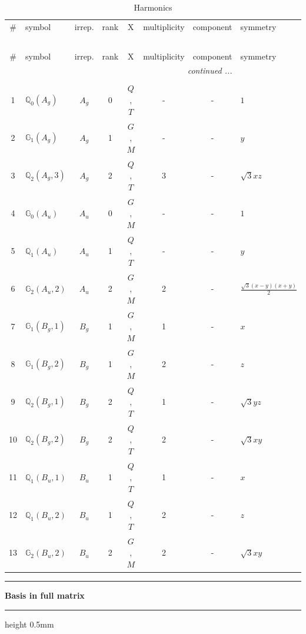 \documentclass[fleqn,10pt,landscape]{jsarticle}
\begin{document}
\renewcommand{\arraystretch}{1.6}
\begin{longtable}[l]{clcccccl}
\captionsetup{justification=raggedright, singlelinecheck=off}
\caption{Harmonics}
 \\
 \hline \hline
\# & symbol & irrep. & rank & X & multiplicity & component & symmetry \\ \hline \endfirsthead

\multicolumn{7}{l}{\tablename\ \thetable{}} \\
 \hline \hline
\# & symbol & irrep. & rank & X & multiplicity & component & symmetry \\ \hline \endhead

 \hline \hline
\multicolumn{7}{r}{\footnotesize\it continued ...} \\ \endfoot

 \hline \hline
\multicolumn{7}{r}{} \\ \endlastfoot

1 & $\mathbb{Q}_{0}(A_{g})$ & $A_{g}$ & 0 & $Q$, $T$ & - & - & $1$ \\ \hline
2 & $\mathbb{G}_{1}(A_{g})$ & $A_{g}$ & 1 & $G$, $M$ & - & - & $y$ \\ \hline
3 & $\mathbb{Q}_{2}(A_{g},3)$ & $A_{g}$ & 2 & $Q$, $T$ & 3 & - & $\sqrt{3} x z$ \\ \hline
4 & $\mathbb{G}_{0}(A_{u})$ & $A_{u}$ & 0 & $G$, $M$ & - & - & $1$ \\ \hline
5 & $\mathbb{Q}_{1}(A_{u})$ & $A_{u}$ & 1 & $Q$, $T$ & - & - & $y$ \\ \hline
6 & $\mathbb{G}_{2}(A_{u},2)$ & $A_{u}$ & 2 & $G$, $M$ & 2 & - & $\frac{\sqrt{3} \left(x - y\right) \left(x + y\right)}{2}$ \\ \hline
7 & $\mathbb{G}_{1}(B_{g},1)$ & $B_{g}$ & 1 & $G$, $M$ & 1 & - & $x$ \\ \hline
8 & $\mathbb{G}_{1}(B_{g},2)$ & $B_{g}$ & 1 & $G$, $M$ & 2 & - & $z$ \\ \hline
9 & $\mathbb{Q}_{2}(B_{g},1)$ & $B_{g}$ & 2 & $Q$, $T$ & 1 & - & $\sqrt{3} y z$ \\ \hline
10 & $\mathbb{Q}_{2}(B_{g},2)$ & $B_{g}$ & 2 & $Q$, $T$ & 2 & - & $\sqrt{3} x y$ \\ \hline
11 & $\mathbb{Q}_{1}(B_{u},1)$ & $B_{u}$ & 1 & $Q$, $T$ & 1 & - & $x$ \\ \hline
12 & $\mathbb{Q}_{1}(B_{u},2)$ & $B_{u}$ & 1 & $Q$, $T$ & 2 & - & $z$ \\ \hline
13 & $\mathbb{G}_{2}(B_{u},2)$ & $B_{u}$ & 2 & $G$, $M$ & 2 & - & $\sqrt{3} x y$ \\
\end{longtable}
\vspace{5mm}
\noindent \rule[0.5mm]{5mm}{0.5mm}\hspace{3mm}\textbf{Basis in full matrix}\hspace{3mm}\leaders\hrule height 0.5mm\hfill\kern0pt
\vspace{3mm}
\end{document}
